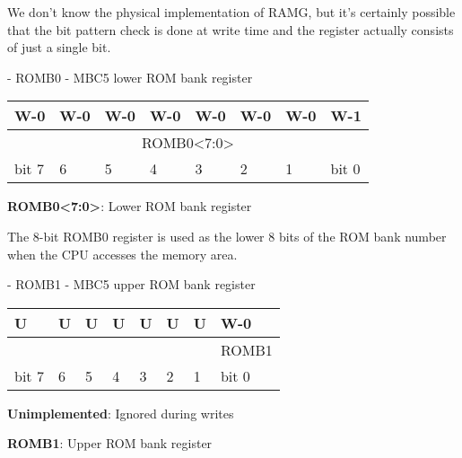 \documentclass[\main/gbctr.tex]{subfiles}
\begin{document}
\begin{speculation}
  We don't know the physical implementation of RAMG, but it's certainly
  possible that the  bit pattern check is done at write time and the
  register actually consists of just a single bit.
\end{speculation}

\begin{register}[H]
  \caption{ - ROMB0 - MBC5 lower ROM bank register}

  {
    \ttfamily
    \begin{tabularx}{\linewidth}{|X|X|X|X|X|X|X|X|}
      \hline
      W-0 & W-0 & W-0 & W-0 & W-0 & W-0 & W-0 & W-1 \\
      \hline
      \multicolumn{8}{|c|}{ROMB0<7:0>} \\
      \hline
      bit 7 & 6 & 5 & 4 & 3 & 2 & 1 & bit 0 \\
      \hline
    \end{tabularx}{\parfillskip=0pt\par}
  }

  \begin{description}[leftmargin=5em, style=nextline]
    \item[bit 7-0]
      \textbf{ROMB0<7:0>}: Lower ROM bank register
  \end{description}
\end{register}

The 8-bit ROMB0 register is used as the lower 8 bits of the ROM bank number
when the CPU accesses the  memory area.

\begin{register}[H]
  \caption{ - ROMB1 - MBC5 upper ROM bank register}

  {
    \ttfamily
    \begin{tabularx}{\linewidth}{|X|X|X|X|X|X|X|X|}
      \hline
      U & U & U & U & U & U & U & W-0 \\
      \hline
      \cellcolor{LightGray} & \cellcolor{LightGray} & \cellcolor{LightGray} & \cellcolor{LightGray} & \cellcolor{LightGray} & \cellcolor{LightGray} & \cellcolor{LightGray} & ROMB1 \\
      \hline
      bit 7 & 6 & 5 & 4 & 3 & 2 & 1 & bit 0 \\
      \hline
    \end{tabularx}{\parfillskip=0pt\par}
  }

  \begin{description}[leftmargin=5em, style=nextline]
    \item[bit 7-1]
      \textbf{Unimplemented}: Ignored during writes
    \item[bit 0]
      \textbf{ROMB1}: Upper ROM bank register
  \end{description}
\end{register}
\end{document}
